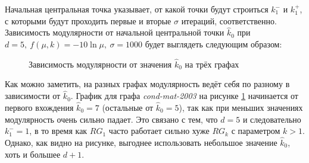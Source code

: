 Начальная центральная точка указывает, от какой точки будут строиться $k_1^{-}$ и $k_1^{+}$, с которыми будут проходить первые и вторые $\sigma$ итераций, соответственно. Зависимость модулярности от начальной центральной точки $\hat{k}_0$ при $d = 5,\ f(\mu, k) = -10 \ln \mu,\ \sigma = 1000$ будет выглядеть следующим образом:

\begin{figure}[H]
	\columnwidth
	\columnwidth
	\caption{Зависимость модулярности от значения $\hat{k}_0$ на трёх графах}
	\label{fig:arg-k0}
\end{figure}

Как можно заметить, на разных графах модулярность ведёт себя по разному в зависимости от $\hat{k}_0$. График для графа \emph{cond-mat-2003} на рисунке \ref{fig:arg-k0} начинается от первого вхождения $\hat{k}_0 = 7$ (остальные от $\hat{k}_0 = 5$), так как при меньших значениях модулярность очень сильно падает. Это связано с тем, что $d = 5$ и следовательно $k_1^{-} = 1$, в то время как $RG_1$ часто работает сильно хуже $RG_k$ с параметром $k > 1$. Однако, как видно на рисунке, выгоднее использовать небольшое значение $\hat{k}_0$, хоть и большее $d + 1$.


